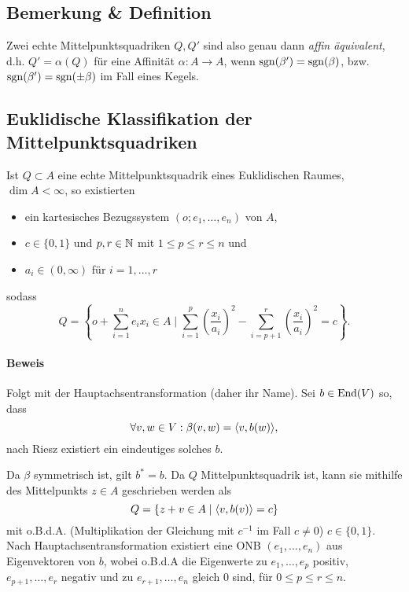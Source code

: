 \subsection{Bemerkung \& Definition}
	Zwei echte Mittelpunktsquadriken $ Q,Q' $ sind also genau dann \emph{affin äquivalent}, d.h. $ Q' = \alpha(Q) $ für eine Affinität $ \alpha:A\to A $, wenn $ \operatorname{sgn}(\beta')=\operatorname{sgn}(\beta) $, bzw. $ \operatorname{sgn}(\beta')=\operatorname{sgn}(\pm \beta) $ im Fall eines Kegels.
\subsection{Euklidische Klassifikation der Mittelpunktsquadriken}
	Ist $ Q\subset A $ eine echte Mittelpunktsquadrik eines Euklidischen Raumes, $ \dim A <\infty $, so existierten 
	\begin{itemize}
		\item ein kartesisches Bezugssystem $ (o;e_1,\dots,e_n) $ von $ A $,
		\item $ c\in \{0,1\} $ und $ p,r\in \mathbb{N} $ mit $ 1\leq p\leq r\leq n $ und
		\item $ a_i\in (0,\infty) $ für $ i=1,\dots,r $
	\end{itemize}
	sodass
		\[ Q = \left\{o+\sum_{i=1}^{n}e_ix_i\in A \mid \sum_{i=1}^{p}\left(\frac{x_i}{a_i}\right)^2-\sum_{i=p+1}^{r}\left(\frac{x_i}{a_i}\right)^2 = c \right\}. \]
\paragraph{Beweis}
	Folgt mit der Hauptachsentransformation (daher ihr Name).
	Sei $ b\in \operatorname{End}(V) $ so, dass
		\[ \forall v,w\in V: \beta(v,w) = \langle v,b(w) \rangle, \]
	nach Riesz existiert ein eindeutiges solches $ b $.
	
	Da $ \beta $ symmetrisch ist, gilt $ b^* = b $. Da $ Q $ Mittelpunktsquadrik ist, kann sie mithilfe des Mittelpunkts $ z\in A $ geschrieben werden als
		\[ Q=\left\{z+v\in A\mid \langle v,b(v) \rangle = c \right\} \]
	mit o.B.d.A. (Multiplikation der Gleichung mit $ c^{-1} $ im Fall $ c\neq 0 $) $ c\in \{0,1\} $. Nach Hauptachsentransformation existiert eine ONB $ (e_1,\dots,e_n) $ aus Eigenvektoren von $ b $, wobei o.B.d.A die Eigenwerte zu $ e_1,\dots,e_p $ positiv, $ e_{p+1},\dots,e_r $ negativ und zu $ e_{r+1},\dots,e_n $ gleich 0 sind, für $ 0\leq p\leq r\leq n $.
	
